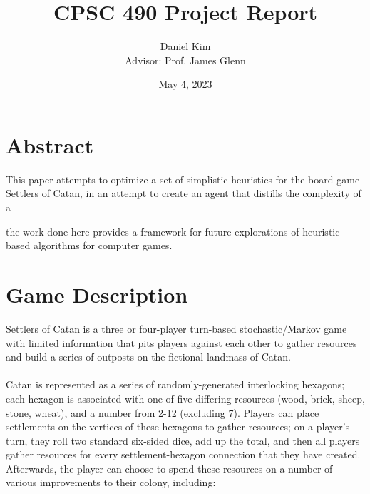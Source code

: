 \documentclass[a4paper, 11pt]{article}
\title{CPSC 490 Project Report}
\author{Daniel Kim\\{Advisor: Prof. James Glenn}}
\date{May 4, 2023}
\begin{document}
\maketitle

\section{Abstract}
This paper attempts to optimize a set of simplistic heuristics for the board game Settlers of Catan, in an attempt to create an agent that distills the complexity of a 

the work done here provides a framework for future explorations of heuristic-based algorithms for computer games.

\section{Game Description}

Settlers of Catan is a three or four-player turn-based stochastic/Markov game with limited information that pits players against each other to gather resources and build a series of outposts on the fictional landmass of Catan. 
\\ \\
\noindent Catan is represented as a series of randomly-generated interlocking hexagons; each hexagon is associated with one of five differing resources (wood, brick, sheep, stone, wheat), and a number from 2-12 (excluding 7). Players can place settlements on the vertices of these hexagons to gather resources; on a player's turn, they roll two standard six-sided dice, add up the total, and then all players gather resources for every settlement-hexagon connection that they have created. Afterwards, the player can choose to spend these resources on a number of various improvements to their colony, including:
\end{document}
